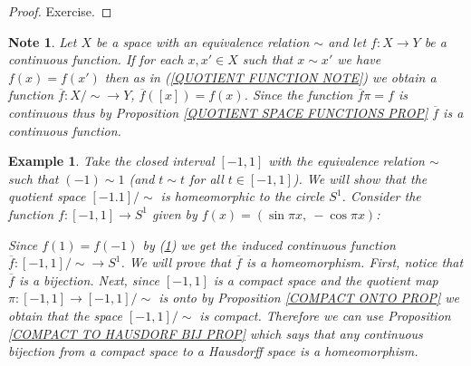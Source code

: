 \documentclass[11pt, letterpaper, oneside]{report}
\theoremstyle{pplain}
\newtheorem{ITERMVALUE THM}[theorem]{Intermediate Value Theorem}
\newtheorem{HEINEBOREL THM}[theorem]{Heine-Borel Theorem}
\newtheorem{UMETR THM}[theorem]{Urysohn Metrization Theorem}
\newtheorem{UMETR2 THM}[theorem]{Urysohn Metrization Theorem (v.2)}
\theoremstyle{ddefinition}
\newtheorem{example}[theorem]{Example}
\newtheorem{note}[theorem]{Note}
\theoremstyle{nnn}
\newtheorem{TDA NN}[theorem]{Topological Data Analysis. }
\theoremstyle{eexercise}
\begin{document}
\begin{proof}
Exercise. 
\end{proof}

\begin{note}
\label{QUOTIENT SPACE FACTORIZATION NOTE}
Let $X$ be a space with an equivalence relation $\sim$ and let $f\colon X \to Y$ be a continuous function. 
If for each $x, x'\in X$ such that $x\sim x'$ we have $f(x) = f(x')$ then as in 
(\ref{QUOTIENT FUNCTION NOTE}) we obtain a function $\overline{f}\colon X/{\sim} \to Y$, 
$\overline{f}([x]) = f(x)$. Since the function $\overline{f}\pi = f$ is continuous thus by 
Proposition \ref{QUOTIENT SPACE FUNCTIONS PROP} $\overline{f}$ is a continuous function. 
\end{note}



\begin{example}
\label{INTERVAL MOD BOUNDARY EXAMPLE}
Take the closed interval $[-1,1]$ with the equivalence relation $\sim$ such that $(-1) \sim 1$
(and $t\sim t$ for all $t\in [-1,1]$). We will show that the quotient space $[-1.1]/{\sim}$ is homeomorphic to the 
circle $S^{1}$.   Consider the function $f\colon [-1,1]\to S^{1}$ given by 
$f(x) = (\sin \pi x, \ -\cos \pi x)$:

%
%
%

 
Since $f(1) = f(-1)$  by (\ref{QUOTIENT SPACE FACTORIZATION NOTE}) we get the induced 
continuous function $\overline{f}\colon [-1,1]/{\sim} \to S^{1}$. We will prove that $\overline{f}$ is a homeomorphism. First, notice that $\overline{f}$ is a bijection.  Next, since $[-1, 1]$  
is a compact space and the quotient map $\pi\colon [-1,1] \to [-1, 1]/{\sim}$ is onto  by 
Proposition \ref{COMPACT ONTO PROP} we obtain that the space $[-1,1]/{\sim}$ is compact.  
Therefore we can use Proposition \ref{COMPACT TO HAUSDORF BIJ PROP} which says 
that any continuous bijection from a compact space to a Hausdorff space  is a homeomorphism. 


\end{example}
\end{document}
